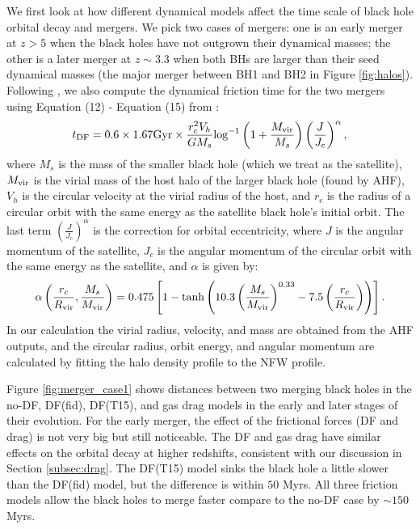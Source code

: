 We first look at how different dynamical models affect the time scale of black hole orbital decay and mergers. We pick two cases of mergers:  one is an early merger at $z>5$ when the black holes have not outgrown their dynamical masses; the other is a later merger at $z \sim 3.3$ when both BHs are larger than their seed dynamical masses (the major merger between BH1 and BH2 in Figure \ref{fig:halos}). Following \cite{Tremmel2015}, we also compute the dynamical friction time for the two mergers using Equation (12) - Equation (15) from \cite{Taffoni2003}:
\begin{equation}
\label{eq:tdf}
    t_{\rm DF} = 0.6\times 1.67\text{Gyr} \times \frac{r_c^2 V_h}{G M_s} \text{log}^{-1} \left( 1+\frac{M_{\rm vir}}{M_s} \right) \left(\frac{J}{J_c}\right)^\alpha,
\end{equation}
where $M_s$ is the mass of the smaller black hole (which we treat as the satellite), $M_{\rm vir}$ is the virial mass of the host halo of the larger black hole (found by AHF), $V_{h}$ is the circular velocity at the virial radius of the host, and $r_c$ is the radius of a circular orbit with the same energy as the satellite black hole's initial orbit. The last term $\left(\frac{J}{J_c}\right)^\alpha$ is the correction for orbital eccentricity, where $J$ is the angular momentum of the satellite, $J_c$ is the angular momentum of the circular orbit with the same energy as the satellite, and $\alpha$ is given by:
\begin{equation}
    \alpha \left( \frac{r_c}{R_{\rm vir}}, \frac{M_s}{M_{\rm vir}} \right) = 0.475 \left[ 1-\text{tanh} \left( 10.3 \left(\frac{M_s}{M_{\rm vir}}\right)^{0.33} - 7.5 \left(\frac{r_c}{R_{\rm vir}}\right) \right)  \right].
\end{equation}
In our calculation the virial radius, velocity, and mass are obtained from the AHF outputs, and the circular radius, orbit energy, and angular momentum are calculated by fitting the halo density profile to the NFW profile.

Figure \ref{fig:merger_case1} shows distances between two merging black holes in the no-DF, DF(fid), DF(T15), and gas drag models in the early and later stages of their evolution. For the early merger, the effect of the frictional forces (DF and drag) is not very big but still noticeable. The DF and gas drag have similar effects on the orbital decay at higher redshifts, consistent with our discussion in Section \ref{subsec:drag}. The DF(T15) model sinks the black hole a little slower than the DF(fid) model, but the difference is within $50$ Myrs. All three friction models allow the black holes to merge faster compare to the no-DF case by $\sim 150$ Myrs.


